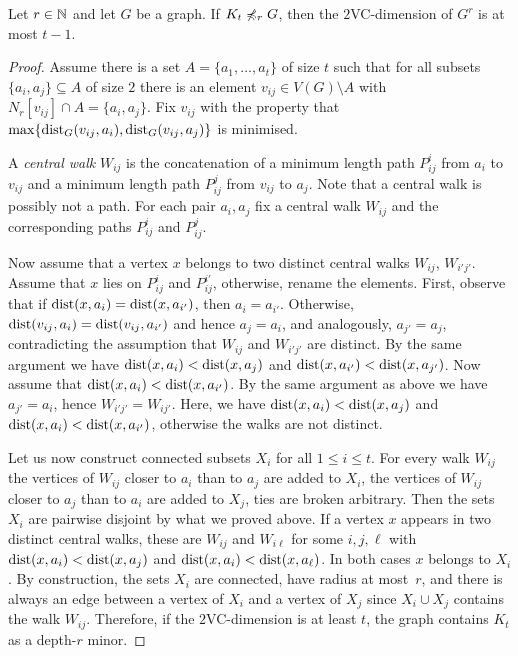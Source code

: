 \begin{theorem}
Let $r\in \mathbb{N}$ and let $G$ be a graph. 
If $K_t\not\preccurlyeq_r G$, then the $2$VC-dimension of $G^r$
is at most $t-1$. 
\end{theorem}
\begin{proof}
Assume there is a set $A=\{a_1,\ldots, a_t\}$ of size $t$ such that
for all subsets $\{a_i,a_j\}\subseteq A$ of size $2$ 
there is an element $v_{ij}\in V(G)\setminus A$ with 
$N_r[v_{ij}]\cap A=\{a_i,a_j\}$. Fix $v_{ij}$ with the property
that $\max\{\mathrm{dist}_G(v_{ij},a_i), \mathrm{dist}_G(v_{ij},a_j)\}$ is 
minimised. 

A \emph{central walk} $W_{ij}$ is the concatenation of a minimum length
path $P_{ij}^i$ from $a_i$ to $v_{ij}$ and a minimum length path $P_{ij}^j$ from $v_{ij}$ to $a_j$. 
Note that a central walk is possibly not a path. For each pair $a_i,a_j$ fix
a central walk $W_{ij}$ and the corresponding paths $P_{ij}^i$ and $P_{ij}^j$. 

Now assume that a vertex $x$ belongs to two distinct central 
walks $W_{ij}$, $W_{i'j'}$. Assume that $x$ lies on $P_{ij}^i$ and $P_{ij}^{i'}$,
otherwise, rename the elements. First, observe that if $\mathrm{dist}(x,a_i)=\mathrm{dist}(x,a_{i'})$, 
then $a_i=a_{i'}$. Otherwise, $\mathrm{dist}(v_{ij},a_{i})=\mathrm{dist}(v_{ij},a_{i'})$ and hence 
$a_j=a_i$, and analogously, $a_{j'}=a_j$, contradicting the assumption 
that $W_{ij}$ and $W_{i'j'}$ are distinct. By the same argument we have 
$\mathrm{dist}(x,a_i)<\mathrm{dist}(x,a_j)$ and $\mathrm{dist}(x,a_{i'})<\mathrm{dist}(x,a_{j'})$. 
Now assume that $\mathrm{dist}(x,a_i)<\mathrm{dist}(x,a_{i'})$. By the same argument as 
above we have $a_{j'}=a_i$, hence $W_{i'j'}=W_{ij'}$. Here, we have
$\mathrm{dist}(x,a_i)<\mathrm{dist}(x,a_j)$ and $\mathrm{dist}(x,a_{i})<\mathrm{dist}(x,a_{i'})$, 
otherwise the walks are not distinct. 

Let us now construct connected subsets $X_i$ for all $1\leq i\leq t$. 
For every walk $W_{ij}$ the vertices of $W_{ij}$ closer to $a_i$ than to $a_j$ 
are added to $X_i$, the vertices of $W_{ij}$ closer to $a_j$ than to $a_i$ 
are added to $X_j$, ties are broken arbitrary.
Then the sets $X_i$ are pairwise disjoint by what we proved above. If a vertex $x$
appears in two distinct central walks, these are $W_{ij}$ and $W_{i\ell}$ for some
$i,j,\ell$ with $\mathrm{dist}(x,a_i)<\mathrm{dist}(x,a_j)$ and $\mathrm{dist}(x,a_i)<\mathrm{dist}(x,a_\ell)$. 
In both cases $x$ belongs to $X_i$. By construction, the sets $X_i$ are connected, 
have radius at most~$r$, and 
there is always an edge between a vertex of $X_i$ and a vertex of $X_j$ since $X_i\cup X_j$ 
contains the walk $W_{ij}$. Therefore, if the $2$VC-dimension is at least $t$, the 
graph contains $K_t$ as a depth-$r$ minor. 
\end{proof}